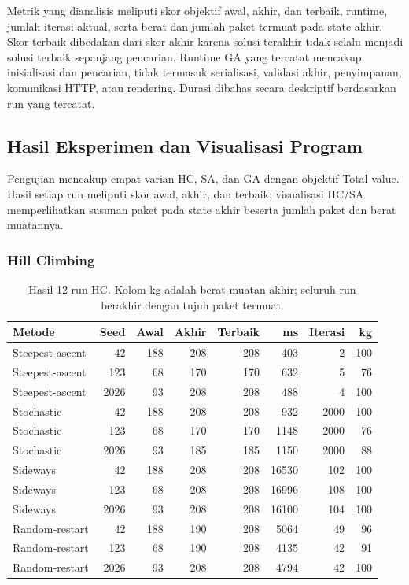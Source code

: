 \documentclass[12pt,a4paper]{article}
\begin{document}
Metrik yang dianalisis meliputi skor objektif awal, akhir, dan terbaik, runtime, jumlah iterasi aktual, serta berat dan jumlah paket termuat pada state akhir. Skor terbaik dibedakan dari skor akhir karena solusi terakhir tidak selalu menjadi solusi terbaik sepanjang pencarian. Runtime GA yang tercatat mencakup inisialisasi dan pencarian, tidak termasuk serialisasi, validasi akhir, penyimpanan, komunikasi HTTP, atau rendering. Durasi dibahas secara deskriptif berdasarkan run yang tercatat.

\subsection{Hasil Eksperimen dan Visualisasi Program}
Pengujian mencakup empat varian HC, SA, dan GA dengan objektif Total value. Hasil setiap run meliputi skor awal, akhir, dan terbaik; visualisasi HC/SA memperlihatkan susunan paket pada state akhir beserta jumlah paket dan berat muatannya.
\subsubsection{Hill Climbing}
\begin{table}[htbp]
\centering
\small
\setlength{\tabcolsep}{4pt}
\begin{tabular}{@{}l r r r r r r r@{}}
\toprule
Metode & Seed & Awal & Akhir & Terbaik & ms & Iterasi & kg \\
\midrule
Steepest-ascent & 42 & 188 & 208 & 208 & 403 & 2 & 100 \\
Steepest-ascent & 123 & 68 & 170 & 170 & 632 & 5 & 76 \\
Steepest-ascent & 2026 & 93 & 208 & 208 & 488 & 4 & 100 \\
Stochastic & 42 & 188 & 208 & 208 & 932 & 2000 & 100 \\
Stochastic & 123 & 68 & 170 & 170 & 1148 & 2000 & 76 \\
Stochastic & 2026 & 93 & 185 & 185 & 1150 & 2000 & 88 \\
Sideways & 42 & 188 & 208 & 208 & 16530 & 102 & 100 \\
Sideways & 123 & 68 & 208 & 208 & 16996 & 108 & 100 \\
Sideways & 2026 & 93 & 208 & 208 & 16100 & 104 & 100 \\
Random-restart & 42 & 188 & 190 & 208 & 5064 & 49 & 96 \\
Random-restart & 123 & 68 & 190 & 208 & 4135 & 42 & 91 \\
Random-restart & 2026 & 93 & 208 & 208 & 4794 & 42 & 100 \\
\bottomrule
\end{tabular}
\caption{Hasil 12 run HC. Kolom kg adalah berat muatan akhir; seluruh run berakhir dengan tujuh paket termuat.}
\label{tab:hasil-hc}
\end{table}
\end{document}
